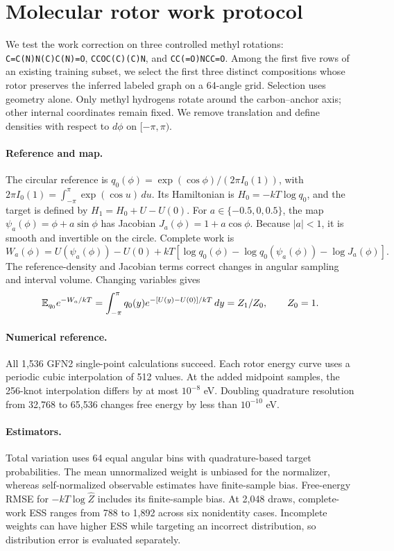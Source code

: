 \section{Molecular rotor work protocol}\label{app:rotor-work}
We test the work correction on three controlled methyl rotations: \texttt{C=C(N)N(C)C(N)=O}, \texttt{CCOC(C)(C)N}, and \texttt{CC(=O)NCC=O}. Among the first five rows of an existing training subset, we select the first three distinct compositions whose rotor preserves the inferred labeled graph on a 64-angle grid. Selection uses geometry alone. Only methyl hydrogens rotate around the carbon--anchor axis; other internal coordinates remain fixed. We remove translation and define densities with respect to $d\phi$ on $[-\pi,\pi)$.

\paragraph{Reference and map.}
The circular reference is $q_0(\phi)=\exp(\cos\phi)/(2\pi I_0(1))$, with $2\pi I_0(1)=\int_{-\pi}^{\pi}\exp(\cos u)\,du$. Its Hamiltonian is $H_0=-kT\log q_0$, and the target is defined by $H_1=H_0+U-U(0)$. For $a\in\{-0.5,0,0.5\}$, the map $\psi_a(\phi)=\phi+a\sin\phi$ has Jacobian $J_a(\phi)=1+a\cos\phi$. Because $|a|<1$, it is smooth and invertible on the circle. Complete work is
\begin{equation}
 W_a(\phi)=U(\psi_a(\phi))-U(0)+kT\left[
 \log q_0(\phi)-\log q_0(\psi_a(\phi))-\log J_a(\phi)\right].
\end{equation}
The reference-density and Jacobian terms correct changes in angular sampling and interval volume. Changing variables gives
\begin{equation}
 \mathbb E_{q_0}e^{-W_a/kT}
 =\int_{-\pi}^{\pi}q_0(y)e^{-[U(y)-U(0)]/kT}\,dy=Z_1/Z_0,
 \qquad Z_0=1.
\end{equation}

\paragraph{Numerical reference.}
All 1,536 GFN2 single-point calculations succeed. Each rotor energy curve uses a periodic cubic interpolation of 512 values. At the added midpoint samples, the 256-knot interpolation differs by at most $10^{-8}$ eV. Doubling quadrature resolution from 32,768 to 65,536 changes free energy by less than $10^{-10}$ eV.

\paragraph{Estimators.}
Total variation uses 64 equal angular bins with quadrature-based target probabilities. The mean unnormalized weight is unbiased for the normalizer, whereas self-normalized observable estimates have finite-sample bias. Free-energy RMSE for $-kT\log\widehat Z$ includes its finite-sample bias. At 2,048 draws, complete-work ESS ranges from 788 to 1,892 across six nonidentity cases. Incomplete weights can have higher ESS while targeting an incorrect distribution, so distribution error is evaluated separately.
